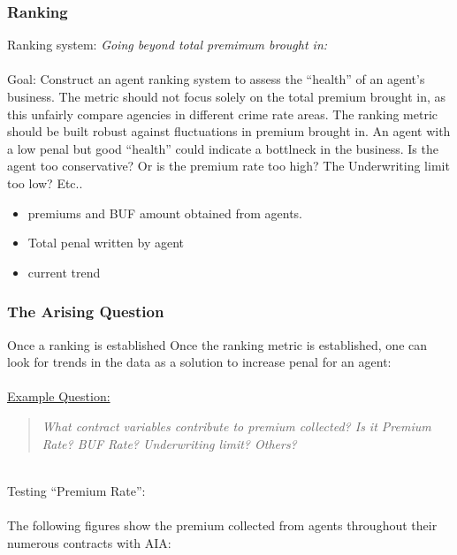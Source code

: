 \documentclass{article}
\begin{document}
\subsubsection{Ranking}
Ranking system: \textit{Going beyond total premimum brought in:} \\
~\\
Goal: Construct an agent ranking system to assess the ``health'' of an 
agent's business. The metric should not focus solely on the total premium 
brought in, as this unfairly compare agencies in different crime rate 
areas. The ranking metric should be built robust against fluctuations 
in premium brought in. An agent with a low penal but good ``health'' 
could indicate a bottlneck in the business.  Is the agent too 
conservative? Or is the premium rate too high? The Underwriting limit too low? Etc..

\begin{itemize}
\item premiums and BUF amount obtained from agents. 
\item Total penal written by agent
\item current trend
\end{itemize}

\subsubsection{The Arising Question}
Once a ranking is established  
Once the ranking metric is established, one can look for trends in the data as a solution to increase penal for an agent:
~\\
~\\
\underline{Example Question:}
\begin{center}
\begin{quote}
\textit{What contract variables contribute to premium collected? Is it Premium Rate? BUF Rate? Underwriting limit? Others?}
\end{quote}
\end{center}

~\\
Testing ``Premium Rate'':
~\\
~\\
The following figures show the premium collected from agents throughout their numerous contracts with AIA:
\end{document}
